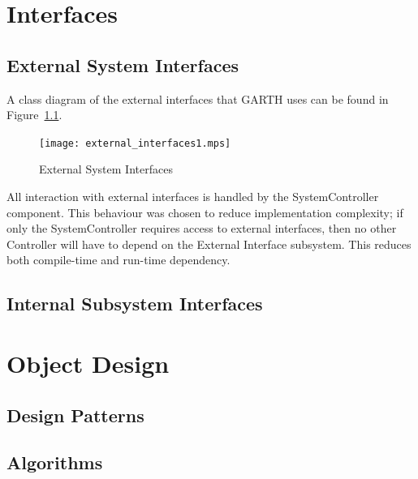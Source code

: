 \documentclass{report}
\begin{document}
\chapter{Interfaces} %
\label{ch:interfaces}

\section{External System Interfaces}

A class diagram of the external interfaces that GARTH uses can be found in
Figure~\ref{fig:external_interfaces}.

\begin{figure}[hp]
    \centering
        \caption{External System Interfaces}
        \scriptsize
        \setlength{\unitlength}{2.0em}
        \texttt{[image: external\_interfaces1.mps]}
        \normalsize
    \label{fig:external_interfaces}
\end{figure}

All interaction with external interfaces is handled by the SystemController
component. This behaviour was chosen to reduce implementation complexity; if
only the SystemController requires access to external interfaces, then
no other Controller will have to depend on the External Interface subsystem.
This reduces both compile-time and run-time dependency.

\section{Internal Subsystem Interfaces}



\chapter{Object Design} %
\label{ch:object-design}

\section{Design Patterns}

\section{Algorithms}
\end{document}

